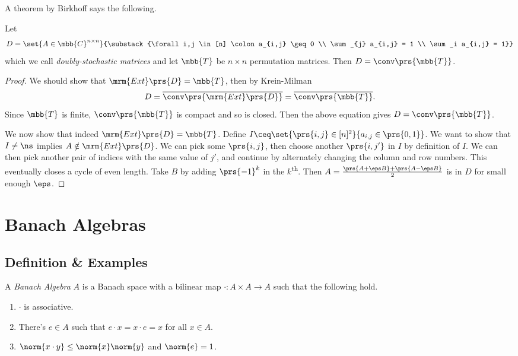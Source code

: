 \documentclass[10pt, twoside]{book}
\begin{document}
\begin{example}
A theorem by Birkhoff says the following.

Let \[D = \set{A \in \mbb{C}^{n \times n}}{\substack{\forall i,j \in [n] \colon a_{i,j} \geq 0 \\ \sum_{j} a_{i,j} = 1 \\ \sum_i a_{i,j} = 1}}\]
which we call \emph{doubly-stochastic matrices}
and let $\mbb{T}$ be $n \times n$ permutation matrices.
Then $D = \conv\prs{\mbb{T}}$.

\begin{proof}
We should show that $\mrm{Ext}\prs{D} = \mbb{T}$, then by Krein-Milman
\[D = \overline{\conv\prs{\mrm{Ext}\prs{D}}} = \overline{\conv\prs{\mbb{T}}} \text{.}\]
Since $\mbb{T}$ is finite, $\conv\prs{\mbb{T}}$ is compact and so is closed. Then the above equation gives $D = \conv\prs{\mbb{T}}$.

We now show that indeed $\mrm{Ext}\prs{D} = \mbb{T}$. Define $I \ceq \set{\prs{i,j} \in [n]^2}{a_{i,j} \in \prs{0,1}}$. We want to show that $I \neq \ns$ implies $A \notin \mrm{Ext}\prs{D}$.
We can pick some $\prs{i,j}$, then choose another $\prs{i,j'}$ in $I$ by definition of $I$. We can then pick another pair of indices with the same value of $j'$, and continue by alternately changing the column and row numbers. This eventually closes a cycle of even length.
Take $B$ by adding $\prs{-1}^k$ in the $k$\textsuperscript{th}. Then $A = \frac{\prs{A + \eps B} + \prs{A - \eps B}}{2}$ is in $D$ for small enough $\eps$.
\end{proof}
\end{example}

\section{Banach Algebras}

\subsection{Definition \& Examples}


\begin{definition}
A \emph{Banach Algebra} $A$ is a Banach space with a bilinear map $\cdot \colon A \times A \to A$ such that the following hold.
\begin{enumerate}
\item $\cdot$ is associative.
\item There's $e \in A$ such that $e \cdot x = x \cdot e = x$ for all $x \in A$.
\item $\norm{x \cdot y} \leq \norm{x} \norm{y}$ and $\norm{e} = 1$.
\end{enumerate}
\end{definition}
\end{document}
